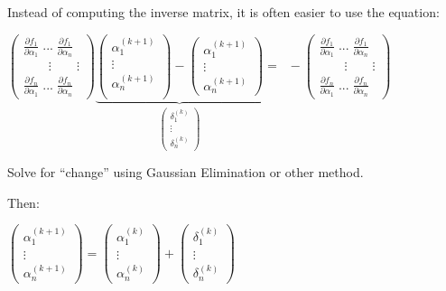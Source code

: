 \documentclass[a4paper,12pt]{report}
\begin{document}
	\noindent Instead of computing the inverse matrix, it is often easier to use the equation:
	\begin{center}
	$
	\begin{pmatrix}
	\frac{\partial f_1}{\partial \alpha_1}\; ... \; \frac{\partial f_1}{\partial \alpha_n}\\
	\qquad \vdots \qquad \vdots \\
	\frac{\partial f_n}{\partial \alpha_1}\; ... \; \frac{\partial f_n}{\partial \alpha_n}
	\end{pmatrix}
	\underbrace{
	\begin{pmatrix}
	\alpha_1^{(k+1)}\\
	\vdots\\
	\alpha_n^{(k+1)}\\
	\end{pmatrix}
	-
	\begin{pmatrix}
	\alpha_1^{(k+1)}\\
	\vdots\\
	\alpha_n^{(k+1)}
	\end{pmatrix}
	}_{
	\begin{pmatrix}
	\delta_1^{(k)}\\
	\vdots \\
	\delta_n^{(k)}
	\end{pmatrix}
	}
	=\;\;-\!\!
	\begin{pmatrix}
	\frac{\partial f_1}{\partial \alpha_1}\; ... \; \frac{\partial f_1}{\partial \alpha_n}\\
	\qquad \vdots \qquad \vdots \\
	\frac{\partial f_n}{\partial \alpha_1}\; ... \; \frac{\partial f_n}{\partial \alpha_n}
	\end{pmatrix}	
	$
	
	\footnotesize{Solve for ``change'' using Gaussian Elimination or other method.}
	\end{center}
	
	Then:
	\begin{center}
		$
		\begin{pmatrix}
		\alpha_1^{(k+1)}\\
		\vdots\\
		\alpha_n^{(k+1)}
		\end{pmatrix}
		=
		\begin{pmatrix}
		\alpha_1^{(k)}\\
		\vdots\\
		\alpha_n^{(k)}
		\end{pmatrix}
		+
		\begin{pmatrix}
		\delta_1^{(k)}\\
		\vdots \\
		\delta_n^{(k)}
		\end{pmatrix}
		$
	\end{center}
	
\end{document}

